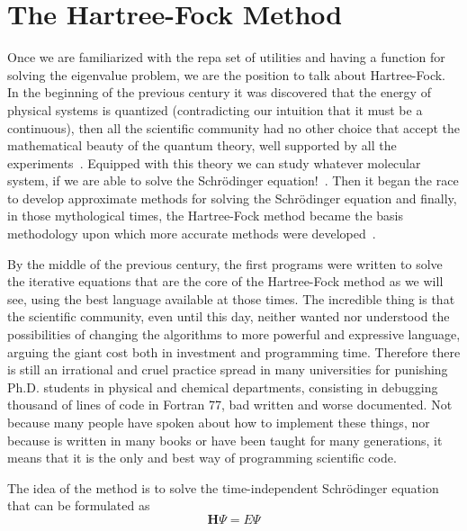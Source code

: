 \documentclass{tmr}
\begin{document}
\section{The Hartree-Fock Method}

Once we are familiarized with the repa set of utilities and having
a function for solving the eigenvalue problem, we are the position to talk about
Hartree-Fock. In the beginning of the previous century it was discovered
that the energy of physical systems is quantized (contradicting our intuition
that it must be a continuous), then all the scientific community had no other choice that accept
the mathematical beauty of the quantum theory, well supported by all the experiments~\cite{quantum}.
 Equipped with this theory we can study whatever molecular system,
if we are able to solve the Schr\"{o}dinger equation!~\cite{Schrodinger}.
Then it began the race to develop approximate methods for solving the Schr\"{o}dinger equation and
finally, in those mythological times, the Hartree-Fock method became
the basis methodology upon which more accurate methods were developed~\cite{hartree-fock}.
 
\par By the middle of the previous century, the first programs were written to solve the 
iterative equations that are the core of the Hartree-Fock method as we will see, using
the best language available at those times. The incredible thing is that the scientific community, even until
this day, neither wanted nor understood the possibilities of changing the algorithms to 
more powerful and expressive language, arguing the giant cost both in investment and programming time. Therefore 
there is still an irrational and cruel practice spread in many universities for punishing Ph.D. students
in physical and chemical departments, consisting in debugging thousand of lines of code in Fortran 77,
bad written and worse documented. Not because many people have spoken about how to implement
these things, nor because is written in many books or have been taught 
for many generations, it means that it is the only and best way of programming scientific code.

\par The idea of the method is to solve the time-independent Schr\"{o}dinger
 equation that can be formulated as
\[ \mathbf{H}\Psi = E\Psi \]
\end{document}
